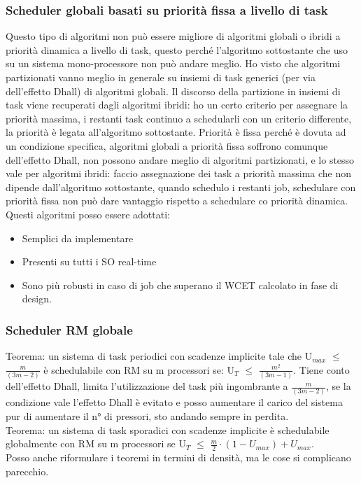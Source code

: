 \documentclass[12pt, oneside]{extbook}
\begin{document}
\subsubsection{Scheduler globali basati su priorità fissa a livello di task}
Questo tipo di algoritmi non può essere migliore di algoritmi globali o ibridi a priorità dinamica a livello di task, questo perché l'algoritmo sottostante che uso su un sistema mono-processore non può andare meglio. Ho visto che algoritmi partizionati vanno meglio in generale su insiemi di task generici (per via dell'effetto Dhall) di algoritmi globali. Il discorso della partizione in insiemi di task viene recuperati dagli algoritmi ibridi: ho un certo criterio per assegnare la priorità massima, i restanti task continuo a schedularli con un criterio differente, la priorità è legata all'algoritmo sottostante. Priorità è fissa perché è dovuta ad un condizione specifica, algoritmi globali a priorità fissa soffrono comunque dell'effetto Dhall, non possono andare meglio di algoritmi partizionati, e lo stesso vale per algoritmi ibridi: faccio assegnazione dei task a priorità massima che non dipende dall'algoritmo sottostante, quando schedulo i restanti job, schedulare con priorità fissa non può dare vantaggio rispetto a schedulare co priorità dinamica.\\ Questi algoritmi posso essere adottati:
\begin{itemize}
\item Semplici da implementare
\item Presenti su tutti i SO real-time
\item Sono più robusti in caso di job che superano il WCET calcolato in fase di design.
\end{itemize}
\subsubsection{Scheduler RM globale}
Teorema: un sistema di task periodici con scadenze implicite tale che U$_{max}$ $\leq$ $\frac{m}{(3m - 2)}$ è schedulabile con RM su m processori se: U$_{T}$ $\leq$ $\frac{m^2}{(3m - 1)}$. Tiene conto dell'effetto Dhall, limita l'utilizzazione del task più ingombrante a $\frac{m}{(3m - 2)}$, se la condizione vale l'effetto Dhall è evitato e posso aumentare il carico del sistema pur di aumentare il n° di pressori, sto andando sempre in perdita.\\ Teorema: un sistema di task sporadici con scadenze implicite è schedulabile globalmente con RM su m processori se U$_T$ $\leq$ $\frac{m}{2} \cdot (1 - U_{max}) + U_{max}$. \\ Posso anche riformulare i teoremi in termini di densità, ma le cose si complicano parecchio.
\end{document}
